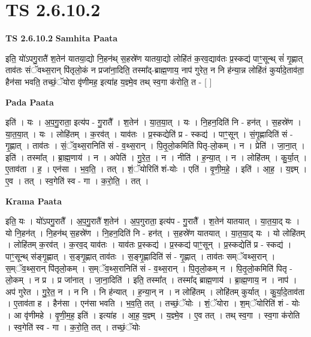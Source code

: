 \documentclass[17pt]{extarticle}
\begin{document}
\section{ TS 2.6.10.2 }

\textbf{TS 2.6.10.2 } \newline
\textbf{Samhita Paata} \newline

इति॒ यो॑ऽपगु॒रातै॑ श॒तेन॑ यातया॒द्यो नि॒हन॑थ् स॒हस्रे॑ण यातया॒द्यो लोहि॑तं क॒रव॒द्याव॑तः प्र॒स्कद्य॑ पाꣳ॒॒सून्थ् सं॑ गृ॒ह्णात् ताव॑तः संॅवथ्स॒रान् पि॑तृलो॒कं न प्रजा॑ना॒दिति॒ तस्मा᳚द्-ब्राह्म॒णाय॒ नाप॑ गुरेत॒ न नि ह॑न्या॒न्न लोहि॑तं कुर्यादे॒ताव॑ता॒ हैन॑सा भवति॒ तच्छं॒ॅयोरा वृ॑णीमह॒ इत्या॑ह य॒ज्ञ्मे॒व तथ् स्व॒गा क॑रोति॒ त - [  ] \newline

\textbf{Pada Paata} \newline

इति॑ । यः । अ॒प॒गु॒राता॒ इत्य॑प - गु॒रातै᳚ । श॒तेन॑ । या॒त॒या॒त् । यः । नि॒हन॒दिति॑ नि - हन॑त् । स॒हस्रे॑ण । या॒त॒या॒त् । यः । लोहि॑तम् । क॒रव॑त् । याव॑तः । प्र॒स्कद्येति॑ प्र - स्कद्य॑ । पाꣳ॒॒सून् । सं॒गृ॒ह्णादिति॑ सं - गृ॒ह्णात् । ताव॑तः । सं॒ॅव॒थ्स॒रानिति॑ सं - व॒थ्स॒रान् । पि॒तृ॒लो॒कमिति॑ पितृ-लो॒कम् । न । प्रेति॑ । जा॒ना॒त् । इति॑ । तस्मा᳚त् । ब्रा॒ह्म॒णाय॑ । न । अपेति॑ । गु॒रे॒त॒ । न । नीति॑ । ह॒न्या॒त् । न । लोहि॑तम् । कु॒र्या॒त् । ए॒ताव॑ता । ह॒ । एन॑सा । भ॒व॒ति॒ । तत् । शं॒ॅयोरिति॑ शं-योः । एति॑ । वृ॒णी॒म॒हे॒ । इति॑ । आ॒ह॒ । य॒ज्ञ्म् । ए॒व । तत् । स्व॒गेति॑ स्व - गा । क॒रो॒ति॒ । तत् ।  \newline


\textbf{Krama Paata} \newline

इति॒ यः । यो॑ऽपगु॒रातै᳚ । अ॒प॒गु॒रातै॑ श॒तेन॑ । अ॒प॒गुराता॒ इत्य॑प - गु॒रातै᳚ । श॒तेन॑ यातयात् । या॒त॒या॒द् यः । यो नि॒हन॑त् । नि॒हन॑थ् स॒हस्रे॑ण । नि॒हन॒दिति॑ नि - हन॑त् । स॒हस्रे॑ण यातयात् । या॒त॒या॒द् यः । यो लोहि॑तम् । लोहि॑तम् क॒रव॑त् । क॒रव॒द् याव॑तः । याव॑तः प्र॒स्कद्य॑ । प्र॒स्कद्य॑ पाꣳ॒॒सून् । प्र॒स्कद्येति॑ प्र - स्कद्य॑ । पाꣳ॒॒सून्थ् स॑ङ्गृ॒ह्णात् । स॒ङ्गृ॒ह्णात् ताव॑तः । स॒ङ्गृ॒ह्णादिति॑ सं - गृ॒ह्णात् । ताव॑तः सम्ॅवथ्स॒रान् । स॒म्ॅव॒थ्स॒रान् पि॑तृलो॒कम् । स॒म्ॅव॒थ्स॒रानिति॑ सं - व॒थ्स॒रान् । पि॒तृ॒लो॒कम् न । पि॒तृ॒लो॒कमिति॑ पितृ - लो॒कम् । न प्र । प्र जा॑नात् । जा॒ना॒दिति॑ । इति॒ तस्मा᳚त् । तस्मा᳚द् ब्राह्म॒णाय॑ । ब्रा॒ह्म॒णाय॒ न । नाप॑ । अप॑ गुरेत । गु॒रे॒त॒ न । न नि । नि ह॑न्यात् । ह॒न्या॒न् न । न लोहि॑तम् । लोहि॑तम् कुर्यात् । कु॒र्या॒दे॒ताव॑ता । ए॒ताव॑ता ह । हैन॑सा । एन॑सा भवति । भ॒व॒ति॒ तत् । 
तच्छं॒ॅयोः । शं॒ॅयोरा । श॒म्ॅयोरिति॑ शं - योः । आ वृ॑णीमहे । वृ॒णी॒म॒ह॒ इति॑ । इत्या॑ह । आ॒ह॒ य॒ज्ञ्म् । य॒ज्ञ्मे॒व । ए॒व तत् । तथ् स्व॒गा । स्व॒गा क॑रोति । स्व॒गेति॑ स्व - गा । क॒रो॒ति॒ तत् । तच्छं॒ॅयोः \newline
\end{document}
